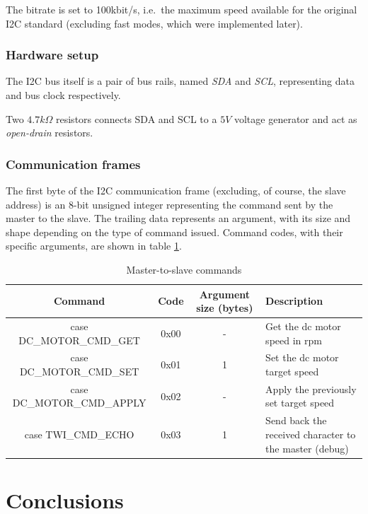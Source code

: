 \documentclass[binding=0.6cm,Lau]{sapthesis}
\begin{document}
The bitrate is set to 100kbit/s, i.e.\ the maximum speed available for the
original I2C standard\cite{i2c-ref} (excluding fast modes, which were
implemented later).

\subsection{Hardware setup}
The I2C bus itself is a pair of bus rails, named \emph{SDA} and \emph{SCL},
representing data and bus clock respectively.

Two $4.7 k\Omega$ resistors connects SDA and SCL to a $5V$ voltage generator
and act as \emph{open-drain} resistors.

\subsection{Communication frames}
The first byte of the I2C communication frame (excluding, of course, the slave
address) is an 8-bit unsigned integer representing the command sent by the
master to the slave. The trailing data represents an argument, with its size
and shape depending on the type of command issued. Command codes, with their
specific arguments, are shown in table \ref{tab:i2c-commands}.

\begin{table}[bh]
  \begin{tabularx}{\textwidth}{c c c X}
    \toprule
    Command & Code & Argument size (bytes) & Description \\
    \midrule
      case DC\_MOTOR\_CMD\_GET & 0x00 & - & Get the dc motor speed in rpm \\
      case DC\_MOTOR\_CMD\_SET & 0x01 & 1 & Set the dc motor target speed \\
      case DC\_MOTOR\_CMD\_APPLY & 0x02 & - & Apply the previously set target speed \\
      case TWI\_CMD\_ECHO & 0x03 & 1 & Send back the received character to the master (debug)\\
    \bottomrule
  \end{tabularx}
  \caption{Master-to-slave commands}
  \label{tab:i2c-commands}
\end{table}


\chapter{Conclusions}
\label{ch:conclusions}


\backmatter
\cleardoublepage
{} %



\end{document}
